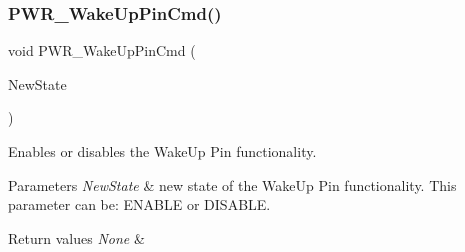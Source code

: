 \subsubsection{\texorpdfstring{PWR\_WakeUpPinCmd()}{PWR\_WakeUpPinCmd()}}
{\footnotesize\ttfamily void P\+W\+R\+\_\+\+Wake\+Up\+Pin\+Cmd (\begin{DoxyParamCaption}\item[{\mbox{\hyperlink{group___exported__types_gac9a7e9a35d2513ec15c3b537aaa4fba1}{Functional\+State}}}]{New\+State }\end{DoxyParamCaption})}



Enables or disables the Wake\+Up Pin functionality. 


\begin{DoxyParams}{Parameters}
{\em New\+State} & new state of the Wake\+Up Pin functionality. This parameter can be\+: E\+N\+A\+B\+LE or D\+I\+S\+A\+B\+LE. \\
\hline
\end{DoxyParams}

\begin{DoxyRetVals}{Return values}
{\em None} & \\
\hline
\end{DoxyRetVals}
